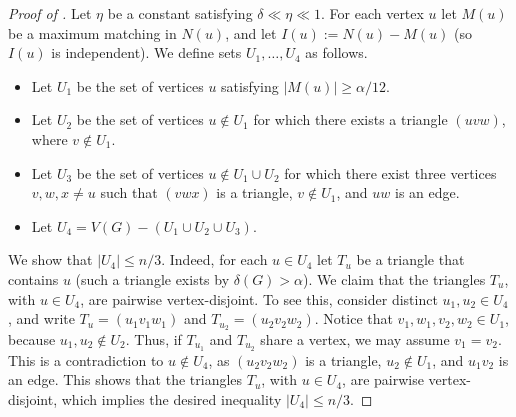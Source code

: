 \documentclass[11pt,english]{article}
\theoremstyle{plain}
\theoremstyle{definition}
\theoremstyle{remark}
\begin{document}
		\begin{proof}[Proof of ]
			Let $\eta$ be a constant satisfying $\delta \ll \eta \ll 1$.
			For each vertex $u$ let $M(u)$ be a maximum matching in $N(u)$, and let $I(u) := N(u) - M(u)$ (so $I(u)$ is independent).
			We define sets $U_1, \ldots, U_4$ as follows. 
			\begin{itemize}
				\item
					Let $U_1$ be the set of vertices $u$ satisfying $|M(u)| \ge \alpha/12$.
				\item
					Let $U_2$ be the set of vertices $u \notin U_1$ for which there exists a triangle $(uvw)$, where $v \notin U_1$. 
				\item
					Let $U_3$ be the set of vertices $u \notin U_1 \cup U_2$ for which there exist three vertices $v,w,x \neq u$ such that $(vwx)$ is a triangle, $v \notin U_1$, and $uw$ is an edge.
				\item
					Let $U_4 = V(G) - (U_1 \cup U_2 \cup U_3)$.
			\end{itemize}
			We show that $|U_4| \le n/3$.
			Indeed, for each $u \in U_4$ let $T_u$ be a triangle that contains $u$ (such a triangle exists by $\delta(G) > \alpha$). 
			We claim that the triangles $T_u$, with $u \in U_4$, are pairwise vertex-disjoint.
			To see this, consider distinct $u_1,u_2 \in U_4$, and write $T_u = (u_1v_1w_1)$ and $T_{u_2} = (u_2v_2w_2)$. Notice that $v_1,w_1,v_2,w_2 \in U_1$, because $u_1,u_2 \notin U_2$. Thus, if $T_{u_1}$ and $T_{u_2}$ share a vertex, we may assume $v_1 = v_2$. This is a contradiction to $u \notin U_4$, as $(u_2v_2w_2)$ is a triangle, $u_2 \notin U_1$, and $u_1v_2$ is an edge.
			This shows that the triangles $T_u$, with $u \in U_4$, are pairwise vertex-disjoint, which implies the desired inequality $|U_4| \le n/3$.


\end{proof}
\end{document}
